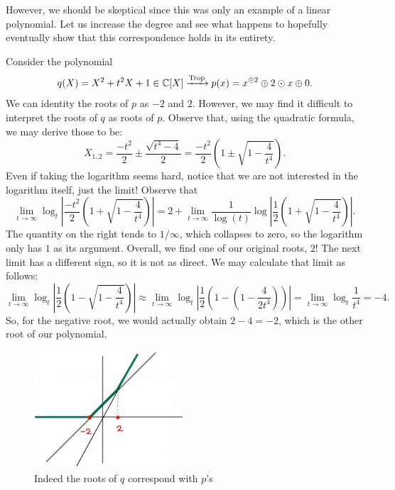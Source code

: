 \documentclass[12pt]{memoir}
\DeclareMathOperator{\Trop}{Trop}
\theoremstyle{definition}
\begin{document}
However, we should be skeptical since this was only an example of a linear polynomial. Let us increase the degree and see what happens to hopefully eventually show that this correspondence holds in its entirety.

\begin{Ex}
    Consider the polynomial
    $$q(X)=X^2+t^2X+1\in\bC[X]\xrightarrow[]{\Trop}p(x)=x^{\odot2}\oplus 2\odot x\oplus 0.$$
    We can identity the roots of $p$ as $-2$ and $2$. However, we may find it difficult to interpret the roots of $q$ as roots of $p$. Observe that, using the quadratic formula, we may derive those to be:
    $$X_{1,2}=\frac{-t^2}{2}\pm\frac{\sqrt{t^4-4}}{2}=\frac{-t^2}{2}\left(1\pm\sqrt{1-\frac{4}{t^4}}\right).$$
    Even if taking the logarithm seems hard, notice that we are not interested in the logarithm itself, just the limit! Observe that 
    $$\lim_{t\to\infty}\log_t\left|\frac{-t^2}{2}\left(1+\sqrt{1-\frac{4}{t^4}}\right)\right|=2+\lim_{t\to\infty}\frac{1}{\log(t)}\log\left|\frac{1}{2}\left(1+\sqrt{1-\frac{4}{t^4}}\right)\right|.$$
    The quantity on the right tends to $1/\infty$, which collapses to zero, so the logarithm only has $1$ as its argument. Overall, we find one of our original roots, $2$! The next limit has a different sign, so it is not as direct. We may calculate that limit as follows:
    $$\lim_{t\to\infty}\log_t\left|\frac{1}{2}\left(1-\sqrt{1-\frac{4}{t^4}}\right)\right|\approx\lim_{t\to\infty}\log_t\left|\frac{1}{2}\left(1-\left(1-\frac{4}{2t^4}\right)\right)\right|=\lim_{t\to\infty}\log_t\frac{1}{t^4}=-4.$$
    So, for the negative root, we would actually obtain $2-4=-2$, which is the other root of our polynomial.
    \begin{figure}[h!]
        \centering
        \includegraphics[width=0.5\textwidth]{figs/fig4-5CorrespondenceRoots2Example.png}
        \caption{Indeed the roots of $q$ correspond with $p$'s}
        \label{fig:4.5-CorrespondenceRoots2Example}
    \end{figure}
\end{Ex}
\end{document}
